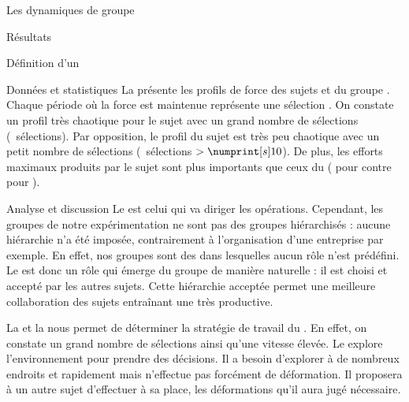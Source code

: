 \documentclass[myfrancais]{mythesis}
\begin{document}
\begin{mychapter}{Les dynamiques de groupe}
\begin{mysection}{Résultats}
\begin{mysubsection}{Définition d'un }
\begin{mysubsubsection}{Données et statistiques}
					La  présente les profils de force  des sujets  et  du groupe .
					Chaque période où la force est maintenue représente une sélection .
					On constate un profil très chaotique pour le sujet  avec un grand nombre de sélections (~sélections).
					Par opposition, le profil du sujet  est très peu chaotique avec un petit nombre de sélections (~sélections $> \mynum[s]{10}$).
					De plus, les efforts maximaux produits par le sujet  sont plus importants que ceux du  ( pour  contre  pour ).
				\end{mysubsubsection}
				\begin{mysubsubsection}{Analyse et discussion}
					Le  est celui qui va diriger les opérations.
					Cependant, les groupes de notre expérimentation ne sont pas des groupes hiérarchisés : aucune hiérarchie n'a été imposée, contrairement à l'organisation d'une entreprise par exemple.
					En effet, nos groupes sont des  dans lesquelles aucun rôle n'est prédéfini.
					Le  est donc un rôle qui émerge du groupe de manière naturelle : il est choisi et accepté par les autres sujets.
					Cette hiérarchie acceptée permet une meilleure collaboration des sujets entraînant une  très productive.

					La  et la  nous permet de déterminer la stratégie de travail du .
					En effet, on constate un grand nombre de sélections ainsi qu'une vitesse élevée.
					Le  explore l'environnement pour prendre des décisions.
					Il a besoin d'explorer à de nombreux endroits et rapidement mais n'effectue pas forcément de déformation.
					Il proposera à un autre sujet d'effectuer à sa place, les déformations qu'il aura jugé nécessaire.


\end{mysubsubsection}
\end{mysubsection}
\end{mysection}
\end{mychapter}
\end{document}
